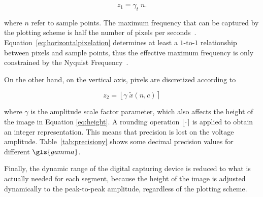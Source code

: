 \begin{equation}
z_1 = \gamma_t  \; n.
\label{eq:horizontalpixelation}
\end{equation}

\noindent where $n$ refer to sample points. The maximum frequency that can be captured by the plotting scheme is half the number of pixels per seconds~\cite{Schomer2010}.  Equation~\ref{eq:horizontalpixelation} determines at least a $1$-to-$1$ relationship between pixels and sample points, thus the effective maximum frequency is only constrained by the Nyquist Frequency~\cite{Oppenheim2009}. 

On the other hand, on the vertical axis, pixels are discretized according to

\begin{equation}
z_2 = \left \lfloor{ \gamma  \; \tilde{x}(n,c)  }\right \rceil
\label{eq:verticalpixelation}
\end{equation}

\noindent where $\gamma$ is the amplitude scale factor parameter, which also affects the height of the image in Equation \ref{eq:height}. A rounding operation $\lfloor  \cdot \rceil$ is applied to obtain an integer representation.  This means that precision is lost on the voltage amplitude.  Table~\ref{tab:precisiony} shows some decimal precision values for different $\gls{gamma}$.

Finally, the dynamic range of the digital capturing device is reduced to what is actually needed for each segment, because the height of the image is adjusted dynamically to the peak-to-peak amplitude, regardless of the plotting scheme.






